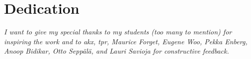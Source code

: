 
\thispagestyle{empty}


\chapter{Dedication}\label{dedication:cha}


\textit{I want to give my special thanks to my students (too many to mention) for inspiring the work and to akx, tpr, Maurice Forget, Eugene Woo, Pekka Enberg, Anoop Bidikar, Otto Seppälä, and Lauri Savioja for constructive feedback.}